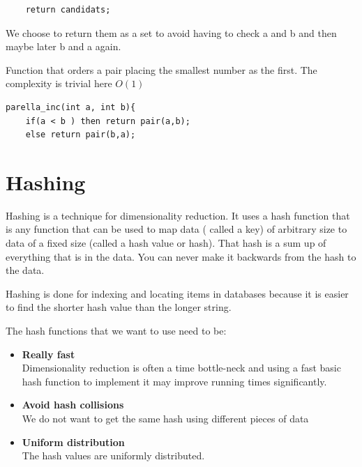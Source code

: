 \documentclass[12pt]{article}
\begin{document}
{\begin{lstlisting}
    return candidats;

 \end{lstlisting}
 We choose to return them as a set to avoid having to check a and b and then maybe later b and a again.
\newline

\begin{large}
Function that orders a pair placing the smallest number as the first. The complexity is trivial here $O(1)$
\end{large}

\begin{lstlisting}
parella_inc(int a, int b){
	if(a < b ) then return pair(a,b);
	else return pair(b,a);
 \end{lstlisting}
 
\section{Hashing}

Hashing is a technique for dimensionality reduction. It uses a hash function that is any function that can be used to map data ( called a key) of arbitrary size to data of a fixed size (called a hash value or hash). That hash is a sum up of everything that is in the data. You can never make it backwards from the hash to the data.

Hashing is done for indexing and locating items in databases because it is easier to find the shorter hash value than the longer string.

The hash functions that we want to use need to be: 

\begin{itemize}
\item \textbf{Really fast}\\
Dimensionality reduction is often a time bottle-neck and using a fast basic hash function to implement it may improve running times significantly. 
\item \textbf{Avoid hash collisions}\\
We do not want to get the same hash using different pieces of data %
\item \textbf{Uniform distribution}\\
The hash values are uniformly distributed.

\end{itemize}

}
\end{document}
